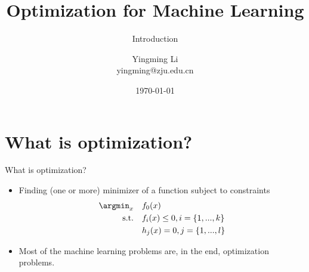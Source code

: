 \documentclass[draft]{beamer}
\title[Opt for ML]{Optimization for Machine Learning}
\subtitle{Introduction}
\author[YingmingLi]{Yingming Li \\ yingming@zju.edu.cn}
\institute[DSERC, ZJU]{Data Science \& Engineering Research Center, ZJU}
\date[\today]{\today}
\begin{document}
\begin{frame}
  \titlepage
\end{frame}



\section{What is optimization?} 

\begin{frame}{What is optimization?}
	\begin{itemize}
		\item<1-> Finding (one or more)  minimizer of a function subject to constraints 
			\begin{equation}
			\begin{aligned}
				\argmin_x \quad & f_0(x)  \\ 
				\textrm{s.t.} \quad & f_i(x) \le 0, i = \{1,...,k\} \\  
				 		\quad & h_j(x) = 0, j = \{1,...,l\} \\ 
			\end{aligned}
			\end{equation}
		\item<2-> Most of the machine learning problems are, in the end, optimization problems. 
	\end{itemize}
\end{frame}	
\end{document}
